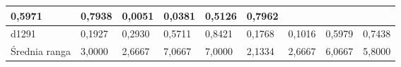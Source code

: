 \begin{table}[ht]
{\begin{tabular}{|l|llll|llll|}
    \multicolumn{1}{l|}{0,5971 } &
    0,7938  &
    \multicolumn{1}{l|}{0,0051 } &
    \multicolumn{1}{l|}{0,0381 } &
    \multicolumn{1}{l|}{0,5126 } &
    0,7962  \\ \hline
  d1291 &
    \multicolumn{1}{l|}{0,1927 } &
    \multicolumn{1}{l|}{0,2930 } &
    \multicolumn{1}{l|}{0,5711 } &
    0,8421  &
    \multicolumn{1}{l|}{0,1768 } &
    \multicolumn{1}{l|}{0,1016 } &
    \multicolumn{1}{l|}{0,5979 } &
    0,7438  \\ \hline
    \multicolumn{1}{|l|}{Średnia ranga} &
    \multicolumn{1}{l|}{3,0000} &
    \multicolumn{1}{l|}{2,6667} &
    \multicolumn{1}{l|}{7,0667} &
    \multicolumn{1}{l|}{7,0000} &
    \multicolumn{1}{l|}{2,1334} &
    \multicolumn{1}{l|}{2,6667} &
    \multicolumn{1}{l|}{6,0667} &
    \multicolumn{1}{l|}{5,8000} \\ \hline
  \end{tabular}%
  }
\end{table}

